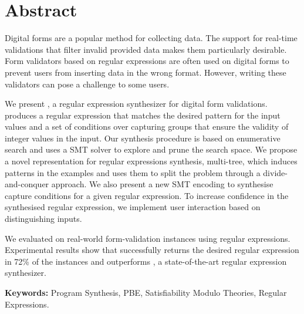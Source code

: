 \section*{Abstract}

Digital forms are a popular method for collecting data.
The support for real-time validations that filter invalid provided data makes them particularly desirable.
Form validators based on regular expressions are often used on digital forms to prevent users from inserting data in the wrong format.
However, writing these validators can pose a challenge to some users.

We present \Forest, a regular expression synthesizer for digital form validations.
\Forest produces a regular expression that matches the desired pattern for the input values 
and 
a set of conditions over capturing groups that ensure the validity of integer values in the input.
Our synthesis procedure is based on enumerative search and uses a \ac{SMT} solver to explore and prune the search space.
We propose a novel representation for regular expressions synthesis, multi-tree, which induces patterns in the examples and uses them to split the problem through a divide-and-conquer approach.
We also present a new \ac{SMT} encoding to synthesise capture conditions for a given regular expression.
To increase confidence in the synthesised regular expression, we implement user interaction based on distinguishing inputs. 

We evaluated \Forest{} on real-world form-validation instances using regular expressions. Experimental results show that \Forest{} successfully returns the desired regular expression in 72\% of the instances and outperforms \Regel, a state-of-the-art regular expression synthesizer.

\vfill

\textbf{\Large Keywords:} Program Synthesis, \acl{PBE}, Satisfiability Modulo Theories, Regular Expressions.
\cleardoublepage
